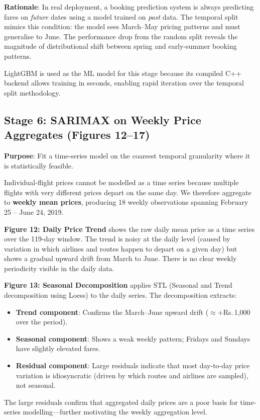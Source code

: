 \documentclass[12pt, a4paper]{article}
\begin{document}
\textbf{Rationale}: In real deployment, a booking prediction system is always
predicting fares on \textit{future} dates using a model trained on \textit{past}
data.  The temporal split mimics this condition: the model sees March--May
pricing patterns and must generalise to June.  The performance drop from the
random split reveals the magnitude of distributional shift between spring and
early-summer booking patterns.

LightGBM is used as the ML model for this stage because its compiled C++
backend allows training in seconds, enabling rapid iteration over the temporal
split methodology.

\subsection{Stage 6: SARIMAX on Weekly Price Aggregates (Figures 12--17)}
\label{sec:sarimax_method}

\textbf{Purpose}: Fit a time-series model on the coarsest temporal granularity
where it is statistically feasible.

Individual-flight prices cannot be modelled as a time series because multiple
flights with very different prices depart on the same day.  We therefore
aggregate to \textbf{weekly mean prices}, producing 18 weekly observations
spanning February 25 -- June 24, 2019.

\textbf{Figure 12: Daily Price Trend} shows the raw daily mean price as a
time series over the 119-day window.  The trend is noisy at the daily level
(caused by variation in which airlines and routes happen to depart on a
given day) but shows a gradual upward drift from March to June.  There is
no clear weekly periodicity visible in the daily data.

\textbf{Figure 13: Seasonal Decomposition} applies STL (Seasonal and Trend
decomposition using Loess) to the daily series.  The decomposition extracts:
\begin{itemize}
    \item \textbf{Trend component}: Confirms the March--June upward drift
    ($\approx +$Rs.\,1{,}000 over the period).
    \item \textbf{Seasonal component}: Shows a weak weekly pattern; Fridays
    and Sundays have slightly elevated fares.
    \item \textbf{Residual component}: Large residuals indicate that most
    day-to-day price variation is idiosyncratic (driven by which routes and
    airlines are sampled), not seasonal.
\end{itemize}
The large residuals confirm that aggregated daily prices are a poor basis for
time-series modelling---further motivating the weekly aggregation level.
\end{document}
